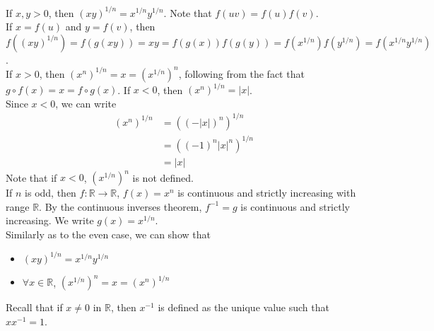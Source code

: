\documentclass[10pt]{extarticle}
\newcommand{\R}{\mathbb{R}}
\begin{document}
    If $x,y > 0$, then $(xy)^{1/n} = x^{1/n}y^{1/n}$. Note that $f(uv) = f(u)f(v)$.\\

    If $x = f(u)$ and $y = f(v)$, then $f\left((xy)^{1/n}\right) = f(g(xy)) = xy = f(g(x))f(g(y)) = f(x^{1/n})f(y^{1/n}) = f(x^{1/n}y^{1/n})$.\\

    If $x > 0$, then $\left(x^{n}\right)^{1/n} = x = \left(x^{1/n}\right)^{n}$, following from the fact that $g\circ f(x) = x = f\circ g(x)$. If $x < 0$, then $\left(x^n\right)^{1/n} = |x|$.\\

    Since $x < 0$, we can write
    \begin{align*}
      (x^n)^{1/n} &= \left(\left(-|x|\right)^{n}\right)^{1/n}\\
                  &= \left(\left(-1\right)^n|x|^{n}\right)^{1/n}\\
                  &= |x|
    \end{align*}
    Note that if $x < 0$, $\left(x^{1/n}\right)^{n}$ is not defined.\\

    If $n$ is odd, then $f: \R\rightarrow \R$, $f(x) = x^n$ is continuous and strictly increasing with range $\R$. By the continuous inverses theorem, $f^{-1} = g$ is continuous and strictly increasing. We write $g(x)=x^{1/n}$.\\

    Similarly as to the even case, we can show that
    \begin{itemize}
      \item $(xy)^{1/n} = x^{1/n}y^{1/n}$
      \item $\forall x\in\R$, $\left(x^{1/n}\right)^n = x = \left(x^n\right)^{1/n}$
    \end{itemize}
    Recall that if $x\neq 0$ in $\R$, then $x^{-1}$ is defined as the unique value such that $xx^{-1} = 1$.\\
\end{document}
